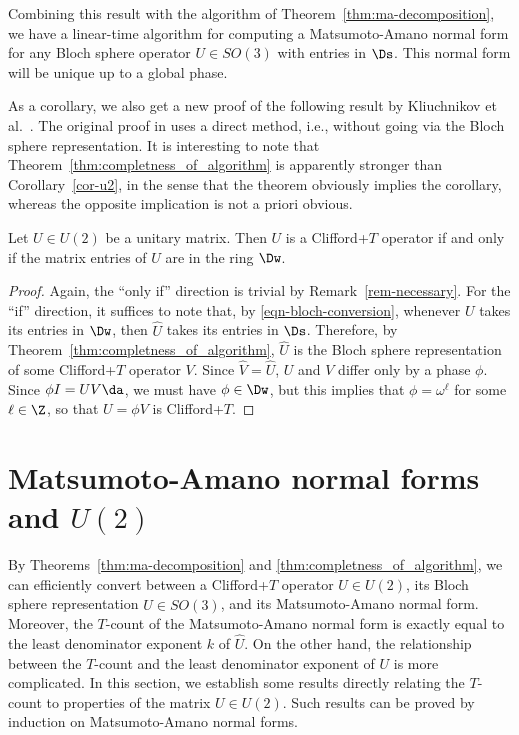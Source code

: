 \documentclass{article}
\begin{document}
\begin{remark}
  Combining this result with the algorithm of
  Theorem~\ref{thm:ma-decomposition}, we have a linear-time algorithm
  for computing a Matsumoto-Amano normal form for any Bloch sphere operator
  $U\in SO(3)$ with entries in $\Ds$. This normal form will be unique
  up to a global phase.
\end{remark}

As a corollary, we also get a new proof of the following result by
Kliuchnikov et al.~{\cite{Kliuchnikov-etal}}. The original proof in
{\cite{Kliuchnikov-etal}} uses a direct method, i.e., without going
via the Bloch sphere representation. It is interesting to note that
Theorem~\ref{thm:completness_of_algorithm} is apparently stronger than
Corollary~\ref{cor-u2}, in the sense that the theorem obviously
implies the corollary, whereas the opposite implication is not a
priori obvious.

\begin{corollary}\label{cor-u2}
  Let $U\in U(2)$ be a unitary matrix. Then $U$ is a Clifford+$T$
  operator if and only if the matrix entries of $U$ are in the ring
  $\Dw$.
\end{corollary}

\begin{proof}
  Again, the ``only if'' direction is trivial by
  Remark~\ref{rem-necessary}.  For the ``if'' direction, it suffices
  to note that, by {\eqref{eqn-bloch-conversion}}, whenever $U$ takes
  its entries in $\Dw$, then $\hat U$ takes its entries in
  $\Ds$. Therefore, by Theorem~\ref{thm:completness_of_algorithm},
  $\hat U$ is the Bloch sphere representation of some Clifford+$T$
  operator $V$. Since $\hat V=\hat U$, $U$ and $V$ differ only by a
  phase $\phi$. Since $\phi I=UV\da$, we must have $\phi\in\Dw$, but
  this implies that $\phi=\omega^{\ell}$ for some $\ell\in\Z$, so that
  $U=\phi V$ is Clifford+$T$.
\end{proof}

\section{Matsumoto-Amano normal forms and {\boldmath $U(2)$}}

By Theorems~\ref{thm:ma-decomposition} and
{\ref{thm:completness_of_algorithm}}, we can efficiently convert
between a Clifford+$T$ operator $U\in U(2)$, its Bloch sphere
representation $\hat U\in SO(3)$, and its Matsumoto-Amano normal
form. Moreover, the $T$-count of the Matsumoto-Amano normal form is
exactly equal to the least denominator exponent $k$ of $\hat U$. On
the other hand, the relationship between the $T$-count and the least
denominator exponent of $U$ is more complicated.  In this section, we
establish some results directly relating the $T$-count to properties
of the matrix $U\in U(2)$. Such results can be proved by induction on
Matsumoto-Amano normal forms.
\end{document}
